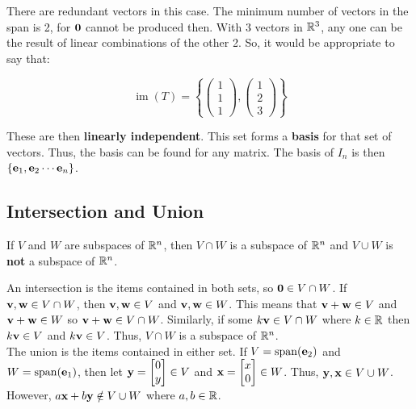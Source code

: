 There are redundant vectors in this case. The minimum number of vectors in the span is 2, 
for $\textbf{0}$ cannot be produced then. With 3 vectors in $\mathbb{R}^3$, any one can be the result of linear combinations of the other 2.
So, it would be appropriate to say that:

\[\operatorname{im}(T)=\left\{\left(\begin{array}{l}
    1 \\
    1 \\
    1
    \end{array}\right),\left(\begin{array}{l}
    1 \\
    2 \\
    3
    \end{array}\right)\right\}\]

These are then \textbf{linearly independent}. This set forms a \textbf{basis} for that set of vectors.
Thus, the basis can be found for any matrix. The basis of $I_n$ is then $\{\textbf{e}_1,\textbf{e}_2\cdots \textbf{e}_n\}$.

\subsection{Intersection and Union}

\begin{framed}
    \noindent If $V$ and $W$ are subspaces of $\mathbb{R}^n$, then $V\cap W$ 
    is a subspace of $\mathbb{R}^n$ and $V\cup W$ is \textbf{not} a subspace of $\mathbb{R}^n$.
\end{framed}

\noindent
An intersection is the items contained in both sets, so $\textbf{0}\in V\cap W$.
If $\textbf{v},\textbf{w}\in V\cap W$, then $\textbf{v},\textbf{w}\in V$ and $\textbf{v},\textbf{w}\in W$. This means that
$\textbf{v}+\textbf{w}\in V$ and $\textbf{v}+\textbf{w}\in W$ so $\textbf{v}+\textbf{w}\in V\cap W$.
Similarly, if some $k\textbf{v}\in V\cap W$ where $k\in \mathbb{R}$ then $k\textbf{v}\in V$ and $k\textbf{v}\in V$. 
Thus, $V\cap W$ is a subspace of $\mathbb{R}^n$.\\

\noindent
The union is the items contained in either set.
If $V=\mathrm{span}(\textbf{e}_2)$ and $W=\mathrm{span}(\textbf{e}_1)$, then let $\textbf{y}=\begin{bmatrix}0\\ y\end{bmatrix}\in V$
and $\textbf{x}=\begin{bmatrix}x\\ 0\end{bmatrix}\in W$. Thus, $\textbf{y},\textbf{x}\in V\cup W$. However,
$a\textbf{x}+b\textbf{y}\notin V\cup W$ where $a,b\in \mathbb{R}$.